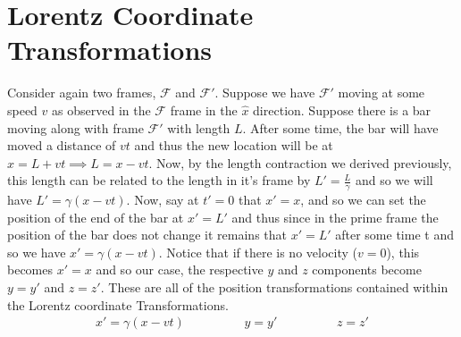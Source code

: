 \documentclass[11pt]{article}
\theoremstyle{definition}
\begin{document}
\section{Lorentz Coordinate Transformations}

Consider again two frames, $\mathcal{F}$ and $\mathcal{F}'$. Suppose we have $\mathcal{F}'$ moving at some speed $v$ as observed in the $\mathcal{F}$ frame in the $\hat{x}$ direction. Suppose there is a bar moving along with frame $\mathcal{F}'$ with length $L$. After some time, the bar will have moved a distance of $vt$ and thus the new location will be at $x=L+vt \implies L=x-vt$. Now, by the length contraction we derived previously, this length can be related to the length in it's frame by $L'= \frac{L}{\gamma}$ and so we will have $L'=\gamma(x-vt)$. Now, say at $t'=0$ that $x'=x$, and so we can set the position of the end of the bar at $x'=L'$ and thus since in the prime frame the position of the bar does not change it remains that $x'=L'$ after some time t and so we have $x'=\gamma (x-vt)$. Notice that if there is no velocity ($v=0$), this becomes $x'=x$ and so our case, the respective $y$ and $z$ components become $y=y'$ and $z=z'$. These are all of the position transformations contained within the Lorentz coordinate Transformations. 
\begin{align}
\boxed{x'=\gamma (x-vt) \hspace{2cm} y=y' \hspace{2cm} z=z'} \label{Lorentz Space}
\end{align}
\end{document}

